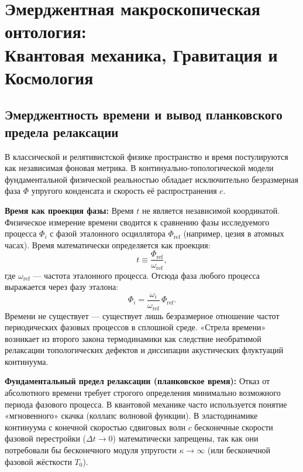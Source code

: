 \documentclass[11pt,a4paper]{article}
\begin{document}
	\section{Эмерджентная макроскопическая онтология:\\ Квантовая механика, Гравитация и Космология}
	
	\subsection{Эмерджентность времени и вывод планковского предела релаксации}
	
	В классической и релятивистской физике пространство и время постулируются как независимая фоновая метрика. В континуально-топологической модели фундаментальной физической реальностью обладает исключительно безразмерная фаза $\Phi$ упругого конденсата и скорость её распространения $c$.
	
	\textbf{Время как проекция фазы:}
	Время $t$ не является независимой координатой. Физическое измерение времени сводится к сравнению фазы исследуемого процесса $\Phi_i$ с фазой эталонного осциллятора $\Phi_{\text{ref}}$ (например, цезия в атомных часах). Время математически определяется как проекция:
	\begin{equation}
		t \equiv \frac{\Phi_{\text{ref}}}{\omega_{\text{ref}}},
	\end{equation}
	где $\omega_{\text{ref}}$ — частота эталонного процесса. Отсюда фаза любого процесса выражается через фазу эталона:
	\begin{equation}
		\Phi_i = \frac{\omega_i}{\omega_{\text{ref}}}\, \Phi_{\text{ref}}.
	\end{equation}
	Времени не существует — существует лишь безразмерное отношение частот периодических фазовых процессов в сплошной среде. «Стрела времени» возникает из второго закона термодинамики как следствие необратимой релаксации топологических дефектов и диссипации акустических флуктуаций континуума.
	
	\textbf{Фундаментальный предел релаксации (планковское время):}
	Отказ от абсолютного времени требует строгого определения минимально возможного периода фазового процесса. В квантовой механике часто используется понятие «мгновенного» скачка (коллапс волновой функции). В эластодинамике континуума с конечной скоростью сдвиговых волн $c$ бесконечные скорости фазовой перестройки ($\Delta t \to 0$) математически запрещены, так как они потребовали бы бесконечного модуля упругости $\kappa \to \infty$ (или бесконечной фазовой жёсткости $T_0$).
	
\end{document}

